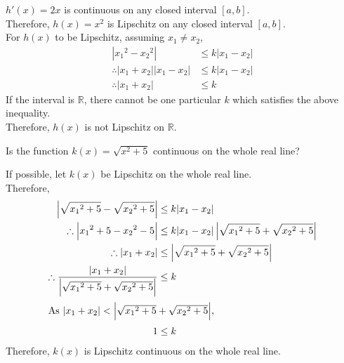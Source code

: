 \documentclass[fleqn, a4paper, 12pt, oneside]{amsart}
\theoremstyle{definition}
\theoremstyle{theorem}
\begin{document}
\begin{solution}
	$h'(x) = 2 x$ is continuous on any closed interval $[a,b]$.\\
	Therefore, $h(x) = x^2$ is Lipschitz on any closed interval $[a,b]$.\\
	For $h(x)$ to be Lipschitz, assuming $x_1 \neq x_2$,
	\begin{align*}
		|{x_1}^2 - {x_2}^2|                & \le k |x_1 - x_2| \\
		\therefore |x_1 + x_2| |x_1 - x_2| & \le k |x_1 - x_2| \\
		\therefore |x_1 + x_2|             & \le k
	\end{align*}
	If the interval is $\mathbb{R}$, there cannot be one particular $k$ which satisfies the above inequality.\\
	Therefore, $h(x)$ is not Lipschitz on $\mathbb{R}$.
\end{solution}

\begin{question}
	Is the function $k(x) = \sqrt{x^2 + 5}$ continuous on the whole real line?
\end{question}

\begin{solution}
	If possible, let $k(x)$ be Lipschitz on the whole real line.\\
	Therefore,
	\begin{align*}
		\left| \sqrt{{x_1}^2 + 5} - \sqrt{{x_2}^2 + 5} \right|                                & \le k |x_1 - x_2|                                                        \\
		\therefore \left| {x_1}^2 + 5 - {x_2}^2 - 5 \right|                                   & \le k |x_1 - x_2| \left| \sqrt{{x_1}^2 + 5} + \sqrt{{x_2}^2 + 5} \right| \\
		\therefore |x_1 + x_2|                                                                & \le \left| \sqrt{{x_1}^2 + 5} + \sqrt{{x_2}^2 + 5} \right|               \\
		\therefore \frac{|x_1 + x_2|}{\left| \sqrt{{x_1}^2 + 5} + \sqrt{{x_2}^2 + 5} \right|} & \le k                                                                    \\
		\intertext{As $|x_1 + x_2| < \left| \sqrt{{x_1}^2 + 5} + \sqrt{{x_2}^2 + 5} \right|$,}
		1                                                                                     & \le k
	\end{align*}
	Therefore, $k(x)$ is Lipschitz continuous on the whole real line.
\end{solution}
\end{document}
